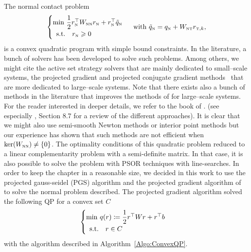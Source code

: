 The normal contact problem
 \begin{equation}
  \label{eq:AO-3-bis}
  \begin{cases}
    \min\, \Frac 1 2 r_\n^\top  W_{\n\n} r_\n + r_\n^\top \tilde q_\n \\
    \begin{array}{ll}
    \text{s.t.} & r_\n \geq 0
  \end{array}\end{cases} \text{ with }   \tilde q_\n =  q_\n + W_{\n\t}r_{\t,k},
\end{equation}
is a convex quadratic program with simple bound constraints.
%
In the literature, a bunch of solvers has been developed to solve such problems. Among others, we might cite the active set strategy solvers \cite{Fletcher1987,Nocedal.Wright1999} that are mainly dedicated to  small--scale systems, the projected gradient \cite{Calamai.More1987} and projected conjugate gradient methods~\citep{More.Toraldo_NM1989,More.Toraldo1991} that are more dedicated to large--scale systems. Note that there exists also a bunch of methods in the literature that improves the methods of \cite{More.Toraldo1991} for large--scale systems. For the reader interested in deeper details, we refer to the book of \cite{Dostal.ea_AMM2016}. (see especially \cite{Dostal.ea_AMM2016}, Section 8.7 for a review of the different approaches).
%
It is clear that we might also use semi-smooth Newton methods or interior point methods but our experience has shown that such methods are not efficient when $\ker (W_{{\hbox{\tiny{N}}}{\hbox{\tiny{N}}}}) \neq \{0\}$. The optimality conditions of this quadratic problem  reduced to a linear complementarity problem with a semi-definite matrix. In that case, it is also possible to solve the problem with PSOR techniques with line-searches.
%
In order to keep the chapter in a reasonable size, we decided in this work to use the projected gauss-seidel (PGS) algorithm and the projected gradient algorithm of   ~\cite{Calamai.More1987} to solve the normal problem described. The projected gradient algorithm solved
the following QP for a convex set $C$
 \begin{equation}
  \label{eq:ConvexQP}
  \begin{cases}
    \min\, q(r) \coloneqq \Frac 1 2 r^\top  W r + r ^\top  b \\
    \begin{array}{ll}
    \text{s.t.} & r \in C
  \end{array}\end{cases}
\end{equation}
with the algorithm described in  Algorithm~\ref{Algo:ConvexQP}.

